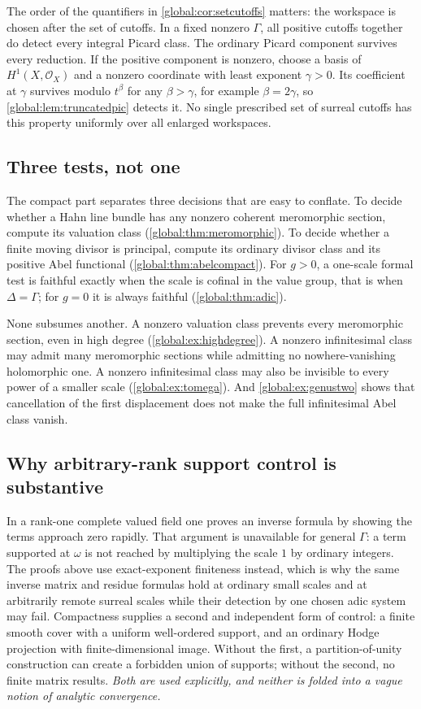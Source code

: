 \documentclass[11pt,letterpaper]{article}
\theoremstyle{definition}
\theoremstyle{remark}
\newcommand{\OO}{\mathcal O}
\numberwithin{equation}{section}
\begin{document}
The order of the quantifiers in \cref{global:cor:setcutoffs} matters: the
workspace is chosen after the set of cutoffs. In a fixed nonzero $\Gamma$,
all positive cutoffs together do detect every integral Picard class. The
ordinary Picard component survives every reduction. If the positive component
is nonzero, choose a basis of $H^1(X,\OO_X)$ and a nonzero coordinate with
least exponent $\gamma>0$. Its coefficient at $\gamma$ survives modulo
$t^\beta$ for any $\beta>\gamma$, for example $\beta=2\gamma$, so
\cref{global:lem:truncatedpic} detects it. No single prescribed set of surreal
cutoffs has this property uniformly over all enlarged workspaces.

\subsection{Three tests, not one}\label{global:sub:threetests}

The compact part separates three decisions that are easy to conflate. To decide whether a Hahn line bundle has any nonzero coherent meromorphic section, compute its valuation class (\cref{global:thm:meromorphic}). To decide whether a finite moving divisor is principal, compute its ordinary divisor class and its positive Abel functional (\cref{global:thm:abelcompact}). For $g>0$, a one-scale formal test is faithful exactly when the scale is cofinal in the value group, that is when $\Delta=\Gamma$; for $g=0$ it is always faithful (\cref{global:thm:adic}).

None subsumes another. A nonzero valuation class prevents every meromorphic section, even in high degree (\cref{global:ex:highdegree}). A nonzero infinitesimal class may admit many meromorphic sections while admitting no nowhere-vanishing holomorphic one. A nonzero infinitesimal class may also be invisible to every power of a smaller scale (\cref{global:ex:tomega}). And \cref{global:ex:genustwo} shows that cancellation of the first displacement does not make the full infinitesimal Abel class vanish.

\subsection{Why arbitrary-rank support control is substantive}\label{global:sub:whyrank}

In a rank-one complete valued field one proves an inverse formula by showing the terms approach zero rapidly. That argument is unavailable for general $\Gamma$: a term supported at $\omega$ is not reached by multiplying the scale $1$ by ordinary integers. The proofs above use exact-exponent finiteness instead, which is why the same inverse matrix and residue formulas hold at ordinary small scales and at arbitrarily remote surreal scales while their detection by one chosen adic system may fail. Compactness supplies a second and independent form of control: a finite smooth cover with a uniform well-ordered support, and an ordinary Hodge projection with finite-dimensional image. Without the first, a partition-of-unity construction can create a forbidden union of supports; without the second, no finite matrix results. \emph{Both are used explicitly, and neither is folded into a vague notion of analytic convergence.}
\end{document}
